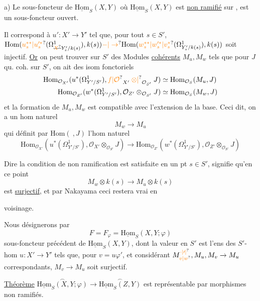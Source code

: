 a) Le sous-foncteur de $\underline{\mathrm{Hom}}_S(X,Y)$ où $\underline{\mathrm{Hom}}_S(X,Y)$ est \uline{non ramifié} sur , est un sous-foncteur ouvert.

Il correspond à $u':X'\to Y'$ tel que, pour tout $s\in S'$, $\mathrm{Hom}(\unsure{u_s^{**}|u_s^{\prime *}}(\Omega^1_{\deleted{\unsure{X}}Y'_s/k(s)}),k(s))\unsure{-|\to}\mathrm{Hom}(\unsure{w_s^{**}|w_s^{\prime *}|v_s^{*}}(\Omega^1_{Y'_s/k(s)}),k(s))$ soit injectif. \uline{Or} on peut trouver sur $S'$ des Modules \uline{cohérents} $M_u,M_w$ tels que pour  $J$ qu. coh. sur $S'$, on ait des isom fonctoriels
\[
\begin{aligned}
\mathrm{Hom}_{\mathcal O_{X'}}(u^*(\Omega^1_{Y'/S'}),\unsure{f|\mathcal O}_{X'}\mathbin{\unsure{\otimes|{}}}_{\mathcal O_{S'}}J)&\simeq\mathrm{Hom}_{\mathcal O_S}(M_u,J)\\
\mathrm{Hom}_{\mathcal O_{Z'}}(w^*(\Omega^1_{Y'/S'}),\mathcal O_{Z'}\otimes_{\mathcal O_{S'}}J)&\simeq\mathrm{Hom}_{\mathcal O_S}(M_w,J)
\end{aligned}
\]
et la formation de $M_u,M_w$ est compatible avec l'extension de la base. Ceci dit, on a un hom naturel
\[
M_w\longrightarrow M_u\tag*{(*)}
\]
qui définit par $\mathrm{Hom}(\ ,J)$ l'hom naturel
\[
\mathrm{Hom}_{\mathcal O_{X'}}(u^*(\Omega^1_{Y'/S'}),\mathcal O_{X'}\otimes_{\mathcal O_{S'}}J)\longrightarrow
\mathrm{Hom}_{\mathcal O_{Z'}}(w^*(\Omega^1_{Y'/S'}),\mathcal O_{Z'}\otimes_{\mathcal O_{S'}}J)
\]

Dire  la condition de non ramification est satisfaite en un pt $s\in S'$, signifie qu'en ce point
\[
M_w\otimes k(s)\longrightarrow M_u\otimes k(s)
\]
est \uline{surjectif}, et par Nakayama ceci restera vrai en

voisinage.

Nous désignerons par
\[
F=F_\varphi=\underline{\mathrm{Hom}}_S(X,Y;\varphi)
\]
 sous-foncteur précédent de $\underline{\mathrm{Hom}}_S(X,Y)$, dont la valeur en $S'$ est l'ens des $S'$-hom $u:X'\to Y'$ tels que, pour $v=u\varphi'$, et considérant $M_{\unsure{v|w}}^{\unsure{\cdot|\prime|{}}},M_u,M_v\to M_u$ correspondants, $M_v\to M_u$ soit surjectif.

\uline{Théorème} $\overset{\frown}{\underline{\mathrm{Hom}}_S(X,Y;\varphi)}\longrightarrow\overset{\frown}{\underline{\mathrm{Hom}}_S(Z,Y)}$ est représentable par morphismes non ramifiés.

